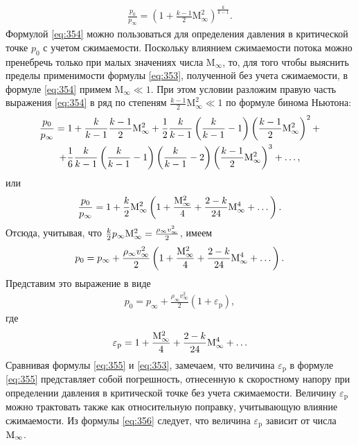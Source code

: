 	\begin{gather}\label{eq:354}
		\frac{p_0}{p_\infty} = \left(1 + \frac{k-1}{2}\mathrm{M_\infty^2}\right)^{\frac{k}{k-1}}.
	\end{gather}\n
	Формулой \eqref{eq:354} можно пользоваться для определения давления в критической точке $p_0$ с учетом сжимаемости.\n
	Поскольку влиянием сжимаемости потока можно пренебречь только при малых значениях числа $\mathrm{M_\infty}$, то, для того чтобы выяснить пределы применимости формулы \eqref{eq:353}, полученной без учета сжимаемости, в формуле \eqref{eq:354} примем $\mathrm{M_\infty}\ll 1$. При этом условии разложим правую часть выражения \eqref{eq:354} в ряд по степеням $\frac{k-1}{2}\mathrm{M_\infty^2}\ll 1$ по формуле бинома Ньютона:
	\begin{gather*}
		\frac{p_0}{p_\infty} = 1 + \frac{k}{k-1}\frac{k-1}{2}\mathrm{M}_\infty^2 + \frac{1}{2}\frac{k}{k-1}\left(\frac{k}{k-1} - 1\right)\left(\frac{k-1}{2}\mathrm{M}_\infty^2\right)^2 +\\+ \frac{1}{6}\frac{k}{k-1}\left(\frac{k}{k-1} - 1\right)\left(\frac{k}{k-1} - 2\right)\left(\frac{k-1}{2}\mathrm{M}_\infty^2\right)^3 + \dots,
	\end{gather*}
	или
	\begin{gather*}
		\frac{p_0}{p_\infty} = 1 + \frac{k}{2}\mathrm{M}_\infty^2\left(1 + \frac{\mathrm{M}_\infty^2}{4} + \frac{2-k}{24}\mathrm{M}_\infty^4 + \dots\right).
	\end{gather*}\n
	Отсюда, учитывая, что $\frac{k}{2}p_\infty\mathrm{M}_\infty^2 = \frac{\rho_\infty v_\infty^2}{2}$, имеем
	\begin{gather*}
		p_0 = p_\infty + \frac{\rho_\infty v_\infty^2}{2}\left(1 + \frac{\mathrm{M}_\infty^2}{4} + \frac{2-k}{24}\mathrm{M}_\infty^4 + \dots\right).
	\end{gather*}\n
	Представим это выражение в виде
	\begin{gather}\label{eq:355}
		p_0 = p_\infty + \frac{\rho_\infty v_\infty^2}{2}\left(1 + \varepsilon_\mathrm{p}\right),
	\end{gather}
	где
	\begin{gather}\label{eq:356}
		\varepsilon_\mathrm{p} = 1 + \frac{\mathrm{M}_\infty^2}{4} + \frac{2-k}{24}\mathrm{M}_\infty^4 + \dots
	\end{gather}\n
	Сравнивая формулы \eqref{eq:355} и \eqref{eq:353}, замечаем, что величина $\varepsilon_\mathrm{p}$ в формуле \eqref{eq:355} представляет собой погрешность, отнесенную к скоростному напору при определении давления в критической точке без учета сжимаемости. Величину $\varepsilon_\mathrm{p}$ можно трактовать также как относительную поправку, учитывающую влияние сжимаемости. Из формулы \eqref{eq:356} следует, что величина $\varepsilon_\mathrm{p}$ зависит от числа $\mathrm{M}_\infty$.\n
